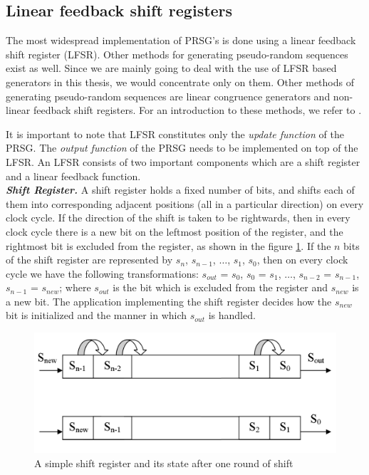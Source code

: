 \subsection{Linear feedback shift registers} 
\label{sec:lfsr}
The most widespread implementation of PRSG's is done using a linear feedback shift register (LFSR). Other methods for generating pseudo-random sequences exist as well. Since we are mainly going to deal with the use of LFSR based generators in this thesis, we would concentrate only on them. Other methods of generating pseudo-random sequences are linear congruence generators and non-linear feedback shift registers. For an introduction to these methods, we refer to \cite{zeng1991pbg}. 

It is important to note that LFSR constitutes only the \emph{update function} of the PRSG. The \emph{output function} of the PRSG needs to be implemented on top of the LFSR. An LFSR consists of two important components which are a shift register and a linear feedback function.\\

\textbf{\emph{Shift Register.}} A shift register holds a fixed number of bits, and shifts each of them into corresponding adjacent positions (all in a particular direction) on every clock cycle. If the direction of the shift is taken to be rightwards, then in every clock cycle there is a new bit on the leftmost position of the register, and the rightmost bit is excluded from the register, as shown in the figure \ref{fig:shift-register}. If the $n$ bits of the shift register are represented by $s_n$, $s_{n-1}$, $\ldots$, $s_{1}$, $s_{0}$, then on every clock cycle we have the following transformations: $s_{out}$ = $s_{0}$, $s_{0}$ = $s_{1}$, $\ldots$, $s_{n-2}$ = $s_{n-1}$, $s_{n-1}$ = $s_{new}$; where $s_{out}$ is the bit which is excluded from the register and $s_{new}$ is a new bit. The application implementing the shift register decides how the $s_{new}$ bit is initialized and the manner in which $s_{out}$ is handled.

\begin{figure}[ht!]
	\centering
		\includegraphics[width=5in]{./figures/shift-register.PNG}
	\caption{A simple shift register and its state after one round of shift}	
	\label{fig:shift-register}
\end{figure}

